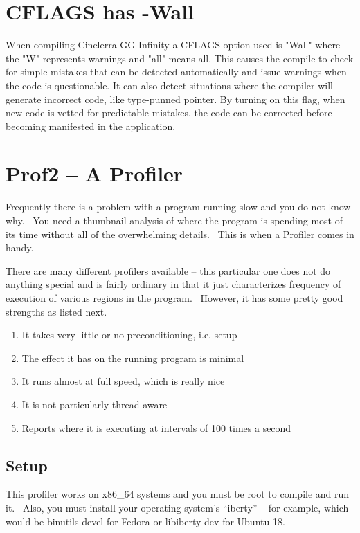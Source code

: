 \section{CFLAGS has -Wall}
\label{sec:CFLAGS has -Wall}
When compiling Cinelerra-GG Infinity a CFLAGS option used is "Wall" where the "W" represents warnings and "all" means all.  This causes the compile to check for simple mistakes that can be detected automatically and issue warnings when the code is questionable.  It can also detect situations where the compiler will generate incorrect code, like type-punned pointer.  By turning on this flag, when new code is vetted for predictable mistakes, the code can be corrected before becoming manifested in the application.

\section{Prof2 -- A Profiler}
\label{sec:Prof2 -- A Profiler}

Frequently there is a problem with a program running slow and you do not know why. \ You need a thumbnail analysis of where the program is spending most of its time without all of the overwhelming details. \ This is when a Profiler comes in handy.
\medskip

There are many different profilers available -- this particular one does not do anything special and is fairly ordinary in that it just characterizes frequency of execution of various regions in the program. \ However, it has some pretty good strengths as listed next.
\medskip
\begin{enumerate}[nosep]
	\item It takes very little or no preconditioning, i.e. setup
	\item The effect it has on the running program is minimal
	\item It runs almost at full speed, which is really nice
	\item It is not particularly thread aware
	\item Reports where it is executing at intervals of 100 times a second
\end{enumerate}
\subsection{Setup}

This profiler works on x86\_64 systems and you must be root to compile and run it. \ Also, you must install your operating system's ``iberty'' -- for example, which would be binutils-devel for Fedora or libiberty-dev for Ubuntu 18.
\medskip

